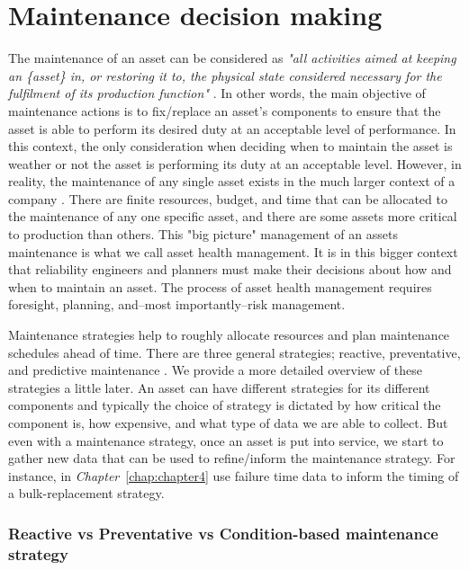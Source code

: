 \section{Maintenance decision making}
\label{sec:decisions}

The maintenance of an asset can be considered as \textit{"all activities aimed at keeping an \{asset\} in, or restoring it to, the physical state considered necessary for the fulfilment of its production function"} \citep{geraerds1985}. In other words, the main objective of maintenance actions is to fix/replace an asset's components to ensure that the asset is able to perform its desired duty at an acceptable level of performance. In this context, the only consideration when deciding when to maintain the asset is weather or not the asset is performing its duty at an acceptable level. However, in reality, the maintenance of any single asset exists in the much larger context of a company \citep{jardine2013}. There are finite resources, budget, and time that can be allocated to the maintenance of any one specific asset, and there are some assets more critical to production than others. This "big picture" management of an assets maintenance is what we call asset health management. It is in this bigger context that reliability engineers and planners must make their decisions about how and when to maintain an asset. The process of asset health management requires foresight, planning, and--most importantly--risk management.

Maintenance strategies help to roughly allocate resources and plan maintenance schedules ahead of time. There are three general strategies; reactive, preventative, and predictive maintenance \citep{}. We provide a more detailed overview of these strategies a little later. An asset can have different strategies for its different components and typically the choice of strategy is dictated by how critical the component is, how expensive, and what type of data we are able to collect. But even with a maintenance strategy, once an asset is put into service, we start to gather new data that can be used to refine/inform the maintenance strategy. For instance, in \textit{Chapter}~\ref{chap:chapter4} use failure time data to inform the timing of a bulk-replacement strategy.

\subsubsection*{Reactive vs Preventative vs Condition-based maintenance strategy}

